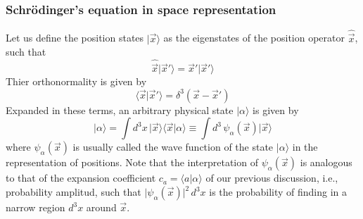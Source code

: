 \subsubsection{Schrödinger's equation in space
representation}
Let us define the position states $\vert \vec{x}\rangle $ as the
eigenstates of the position operator $\hat{\vec{x}}$, such
that
\begin{equation}
  \hat{\vec{x}} \vert \vec{x}'\rangle  = \vec{x}'\vert \vec{x}'\rangle 
  \label{equ:2.28}
\end{equation}
Thier orthonormality is given by
\begin{equation}
  \langle \vec{x}\vert \vec{x}'\rangle  = \delta^3(\vec{x}-\vec{x}')
  \label{equ:2.29}
\end{equation}
Expanded in these terms, an arbitrary physical state
$\vert \alpha\rangle $ is given by
$$
  \vert \alpha\rangle  = \int d^3 x \, \vert \vec{x}\rangle \langle \vec{x}\vert \alpha\rangle  \equiv
  \int d^3 \, \psi_{\alpha}(\vec{x}) \vert \vec{x}\rangle 
$$
where $\psi_{\alpha}(\vec{x})$ is usually called the wave
function of the state $\vert \alpha\rangle $ in the representation of
positions. Note that the interpretation of
$\psi_{\alpha}(\vec{x})$ is analogous to that of the
expansion coefficient $c_a = \langle a\vert \alpha\rangle $ of our previous
discussion, i.e., probability amplitud, such that
$\vert \psi_{\alpha}(\vec{x})\vert ^2\, d^3x$ is the probability of
finding in a narrow region $d^3 x$ around $\vec{x}$.

